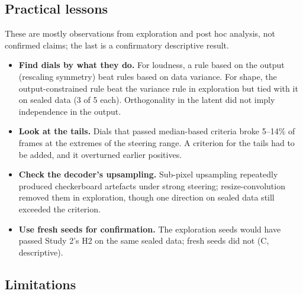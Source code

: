 \documentclass[10pt]{article}
\begin{document}
\subsection{Practical lessons}\label{sec:7.4}

These are mostly observations from exploration and post hoc analysis, not confirmed claims; the last is a confirmatory descriptive result.

\begin{itemize}
\item \textbf{Find dials by what they do.} For loudness, a rule based on the output (rescaling symmetry) beat rules based on data variance. For shape, the output-constrained rule beat the variance rule in exploration but tied with it on sealed data (3 of 5 each). Orthogonality in the latent did not imply independence in the output.
\item \textbf{Look at the tails.} Dials that passed median-based criteria broke 5--14\% of frames at the extremes of the steering range. A criterion for the tails had to be added, and it overturned earlier positives.
\item \textbf{Check the decoder's upsampling.} Sub-pixel upsampling repeatedly produced checkerboard artefacts under strong steering; resize-convolution removed them in exploration, though one direction on sealed data still exceeded the criterion.
\item \textbf{Use fresh seeds for confirmation.} The exploration seeds would have passed Study 2's H2 on the same sealed data; fresh seeds did not (C, descriptive).
\end{itemize}

\subsection{Limitations}\label{sec:7.5}
\end{document}
